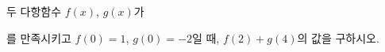 두 다항함수 $f(x)$, $g(x)$가 \par\smallskip{}\par\smallskip\noindent 를 만족시키고 $f(0)=1$, $g(0)=-2$일 때, $f(2)+g(4)$의 값을 구하시오.
